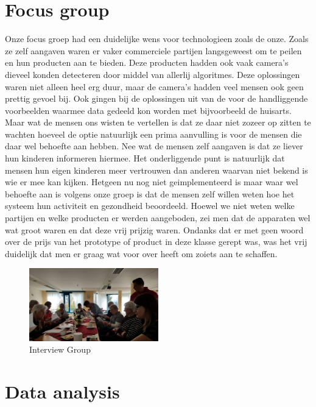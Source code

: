 \documentclass{below-ext}
\begin{document}
\section{Focus group}
Onze focus groep had een duidelijke wens voor technologieen zoals de onze. Zoals ze zelf aangaven waren er vaker commerciele partijen langsgeweest om te peilen en hun producten aan te bieden. Deze producten hadden ook vaak camera's dieveel konden detecteren door middel van allerlij algoritmes. Deze oplossingen waren niet alleen heel erg duur, maar de camera's hadden veel mensen ook geen prettig gevoel bij. Ook gingen bij de oplossingen uit van de voor de handliggende voorbeelden waarmee data gedeeld kon worden met bijvoorbeeld de huisarts. Maar wat de mensen ons wisten te vertellen is dat ze daar niet zozeer op zitten te wachten hoeveel de optie natuurlijk een prima aanvulling is voor de mensen die daar wel behoefte aan hebben. Nee wat de mensen zelf aangaven is dat ze liever hun kinderen informeren hiermee. Het onderliggende punt is natuurlijk dat mensen hun eigen kinderen meer vertrouwen dan anderen waarvan niet bekend is wie er mee kan kijken. Hetgeen nu nog niet geimplementeerd is maar waar wel behoefte aan is volgens onze groep is dat de mensen zelf willen weten hoe het systeem hun activiteit en gezondheid beoordeeld. Hoewel we niet weten welke partijen en welke producten er werden aangeboden, zei men dat de apparaten wel wat groot waren en dat deze vrij prijzig waren. Ondanks dat er met geen woord over de prijs van het prototype of product in deze klasse gerept was, was het vrij duidelijk dat men er graag wat voor over heeft om zoiets aan te schaffen. 
\begin{figure}
\center
\label{fig2:interview}
\includegraphics[width=0.5\textwidth]{interview}
\caption{Interview Group}
\end{figure}
\section{Data analysis}
\end{document}

